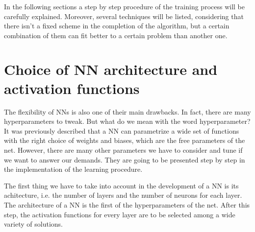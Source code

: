 In the following sections a step by step procedure of the training process will be carefully explained. Moreover, several techniques will be listed, considering that there isn't a fixed scheme in the completion of the algorithm, but a certain combination of them can fit better to a certain problem than another one.



\begin{comment}
\section{Training a Neural Network}
In practice applications, given a set of data $\mathcal{D}$ whose tendency and distribution we want to describe, the philosophy behind Neural Networks and Deep Learning is finding the best choice of free parameters that describes $\mathcal{D}$. In order to accomplish this goal, we have to implement an algorithm which updates the free parameters, i.e. weights and biases, to make them suitable to describe the dataset and its generalization to a bigger one.
\end{comment}



\section{Choice of NN architecture and activation functions}
The flexibility of NNs is also one of their main drawbacks. In fact, there are many hyperparameters to tweak. But what do we mean with the word hyperparameter? It was previously described that a NN can parametrize a wide set of functions with the right choice of weights and biases, which are the free parameters of the net. However, there are many other parameters we have to consider and tune if we want to answer our demands. They are going to be presented step by step in the implementation of the learning procedure.

The first thing we have to take into account in the development of a NN is its achitecture, i.e. the number of layers and the number of neurons for each layer. The architecture of a NN is the first of the hyperparameters of the net. After this step, the activation functions for every layer are to be selected among a wide variety of solutions.

